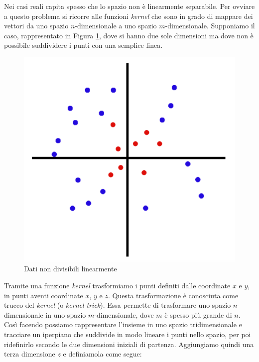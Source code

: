 \documentclass[12pt,italian]{report}
\begin{document}
Nei casi reali capita spesso che lo spazio non è linearmente separabile. Per ovviare a questo problema si ricorre alle funzioni \emph{kernel} che sono in grado di mappare dei vettori da uno spazio $n$-dimensionale a uno spazio $m$-dimensionale.
Supponiamo il caso, rappresentato in Figura \ref{fig:svc_non_linear}, dove si hanno due sole dimensioni ma dove non è possibile suddividere i punti con una semplice linea.

\begin{figure}[h!]
	\center
	\includegraphics[scale=0.5]{../img/svc_non_linear} %
	\caption{Dati non divisibili linearmente}
	\label{fig:svc_non_linear}
\end{figure}

Tramite una funzione \emph{kernel} trasformiamo i punti definiti dalle coordinate $x$ e $y$, in punti aventi coordinate $x$, $y$ e $z$. Questa trasformazione è conosciuta come trucco del \emph{kernel} (o \emph{kernel trick}). Essa permette di trasformare uno spazio $n$-dimensionale in uno spazio $m$-dimensionale, dove $m$ è spesso più grande di $n$. Così facendo possiamo rappresentare l'insieme in uno spazio tridimensionale e tracciare un iperpiano che suddivide in modo lineare i punti nello spazio, per poi ridefinirlo secondo le due dimensioni iniziali di partenza.
Aggiungiamo quindi una terza dimensione $z$ e definiamola come segue:
\end{document}
